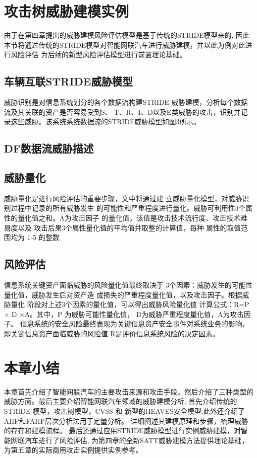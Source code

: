 \section{攻击树威胁建模实例}
由于在第四章提出的威胁建模风险评估模型是基于传统的STRIDE模型来的, 因此本节将通过传统的STRIDE模型对智能网联汽车进行威胁建模，并以此为例对此进行风险评估
为后续的新型风险评估模型进行前置理论基础。

\subsection{车辆互联STRIDE威胁模型}
威胁识别是对信息系统划分的各个数据流构建STRIDE
威胁建模，分析每个数据流及其关联的资产是否容易受到S、 T、R、I、D以及E类威胁的攻击，识别并记录这些威胁。该系统系统数据流的STRIDE威胁模型如图3所示。

\subsection{DF数据流威胁描述}

\subsection{威胁量化}
威胁量化是进行风险评估的重要步骤，文中将通过建
立威胁量化模型，对威胁识别过程中记录的所有威胁发生
的可能性和严重程度进行量化。威胁可利用性3个属性的量化值之和。A为攻击因子
的量化值，该值是攻击技术流行度、攻击技术难易度以及
攻击后果3个属性量化值的平均值并取整的计算值，每种
属性的取值范围均为 1-5 的整数

\subsection{风险评估}
信息系统关键资产面临威胁的风险量化值最终取决于
3个因素：威胁发生的可能性量化值，威胁发生后对资产造
成损失的严重程度量化值，以及攻击因子。根据威胁量化
阶段对上述3个因素的量化值，可以得出威胁风险量化值
计算公式：R=P × D ×A。其中，P 为威胁可能性量化值，
D为威胁严重程度量化值，A为攻击因子。
信息系统的安全风险最终表现为关键信息资产安全事件对系统业务的影响，即关键信息资产面临威胁的风险值
R是评价信息系统风险的决定因素。


\section{本章小结}
本章首先介绍了智能网联汽车的主要攻击来源和攻击手段。然后介绍了三种类型的威胁方面。最后主要介绍智能网联汽车领域的威胁建模分析:
首先介绍传统的 STRIDE 模型，攻击树模型，CVSS 和 新型的HEAVES安全模型.此外还介绍了AHP和FAHP层次分析法用于定量分析。
详细阐述其建模原理和步骤，梳理威胁
的存在和建模流程。
最后还通过应用STRIDE威胁模型进行实例威胁建模，对智能网联汽车进行了风险评估,
为第四章的全新SATT威胁建模方法提供理论基础，为第五章的实际商用攻击实例提供实例参考。